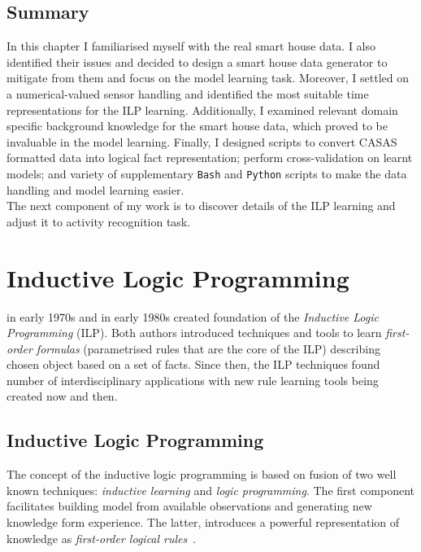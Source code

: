 \documentclass[10pt, a4paper, pdflatex, leqno, twoside, openright]{report}
\begin{document}
  \section{Summary}
In this chapter I familiarised myself with the real smart house data. I also identified their issues and decided to design a smart house data generator to mitigate from them and focus on the model learning task. Moreover, I settled on a numerical-valued sensor handling and identified the most suitable time representations for the ILP learning. Additionally, I examined relevant domain specific background knowledge for the smart house data, which proved to be invaluable in the model learning. Finally, I designed scripts to convert CASAS formatted data into logical fact representation; perform cross-validation on learnt models; and variety of supplementary \texttt{Bash} and \texttt{Python} scripts to make the data handling and model learning easier.\\
The next component of my work is to discover details of the ILP learning and adjust it to activity recognition task.

\chapter{Inductive Logic Programming\label{ch:ILP}}
\citet{plotkin1972automatic} in early 1970s and \citet{shapiro1983algorithmic} in early 1980s created foundation of the \emph{Inductive Logic Programming} (ILP). Both authors introduced techniques and tools to learn \emph{first-order formulas} (parametrised rules that are the core of the ILP) describing chosen object based on a set of facts. Since then, the ILP techniques found number of interdisciplinary applications with new rule learning tools being created now and then.

  \section{Inductive Logic Programming}
The concept of the inductive logic programming is based on fusion of two well known techniques: \emph{inductive learning} and \emph{logic programming}. The first component facilitates building model from available observations and generating new knowledge form experience. The latter, introduces a powerful representation of knowledge as \emph{first-order logical rules}~\citep{muggleton1994inductive,muggleton1995inverse}.
\end{document}
